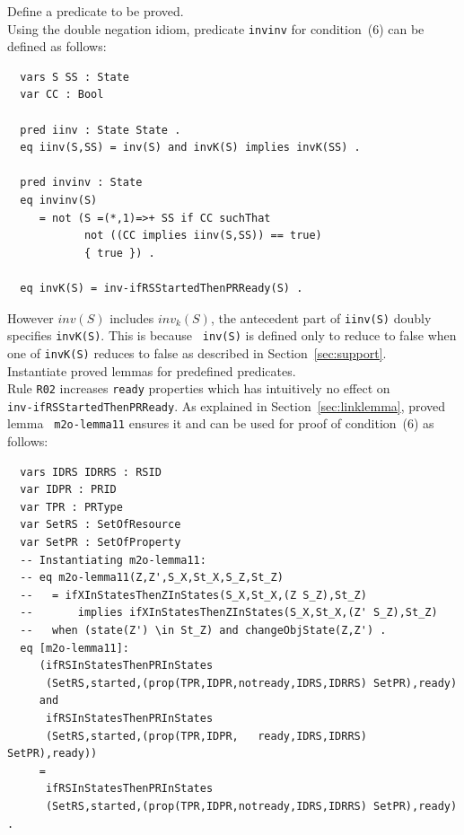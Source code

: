 \documentclass[12pt]{report}
\newcommand{\stt}[1]{{\small{\tt {#1}}}}
\begin{document}
 Define a predicate to be proved. \\ Using the
double negation idiom, predicate {\tt invinv} for
condition~(6) can be defined as follows:
\small
\begin{verbatim}
  vars S SS : State
  var CC : Bool

  pred iinv : State State .
  eq iinv(S,SS) = inv(S) and invK(S) implies invK(SS) .

  pred invinv : State
  eq invinv(S)
     = not (S =(*,1)=>+ SS if CC suchThat
            not ((CC implies iinv(S,SS)) == true)
            { true }) .

  eq invK(S) = inv-ifRSStartedThenPRReady(S) .
\end{verbatim}
\normalsize
However $inv(S)$ includes $inv_k(S)$, the antecedent part of
\stt{iinv(S)} doubly specifies \stt{invK(S)}. This is because {\tt
  inv(S)} is defined only to reduce to false when one of {\tt invK(S)}
reduces to false as described in Section~\ref{sec:support}.\\

 Instantiate proved lemmas for predefined
predicates. \\ Rule {\tt R02} increases {\tt ready} properties which
has intuitively no effect on \\ {\tt inv-ifRSStartedThenPRReady}. As
explained in Section~\ref{sec:linklemma}, proved lemma {\tt
  m2o-lemma11} ensures it and can be used for proof of
condition~(6) as follows:
\small
\begin{verbatim}
  vars IDRS IDRRS : RSID 
  var IDPR : PRID
  var TPR : PRType
  var SetRS : SetOfResource
  var SetPR : SetOfProperty
  -- Instantiating m2o-lemma11:
  -- eq m2o-lemma11(Z,Z',S_X,St_X,S_Z,St_Z)
  --   = ifXInStatesThenZInStates(S_X,St_X,(Z S_Z),St_Z)
  --       implies ifXInStatesThenZInStates(S_X,St_X,(Z' S_Z),St_Z) 
  --   when (state(Z') \in St_Z) and changeObjState(Z,Z') .
  eq [m2o-lemma11]:
     (ifRSInStatesThenPRInStates
      (SetRS,started,(prop(TPR,IDPR,notready,IDRS,IDRRS) SetPR),ready)
     and
      ifRSInStatesThenPRInStates
      (SetRS,started,(prop(TPR,IDPR,   ready,IDRS,IDRRS) SetPR),ready))
     = 
      ifRSInStatesThenPRInStates
      (SetRS,started,(prop(TPR,IDPR,notready,IDRS,IDRRS) SetPR),ready) .
\end{verbatim}
\normalsize
\end{document}
